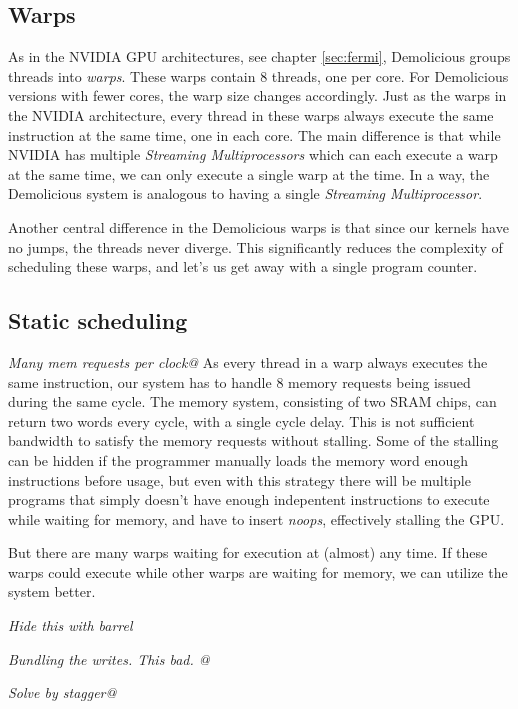 \documentclass[../main/report.tex]{subfiles}
\begin{document}
\subsection{Warps}

As in the NVIDIA GPU architectures, see chapter \ref{sec:fermi}, Demolicious groups threads into \emph{warps}.
These warps contain 8 threads, one per core. 
For Demolicious versions with fewer cores, the warp size changes accordingly.
Just as the warps in the NVIDIA architecture, every thread in these warps always execute the same instruction at the same time, one in each core.
The main difference is that while NVIDIA has multiple \emph{Streaming Multiprocessors} which can each execute a warp at the same time, we can only execute a single warp at the time.
In a way, the Demolicious system is analogous to having a single \emph{Streaming Multiprocessor}.

Another central difference in the Demolicious warps is that since our kernels have no jumps, the threads never diverge.
This significantly reduces the complexity of scheduling these warps, and let's us get away with a single program counter.

\subsection{Static scheduling}

\emph{Many mem requests per clock@}
As every thread in a warp always executes the same instruction, our system has to handle 8 memory requests being issued during the same cycle.
The memory system, consisting of two SRAM chips, can return two words every cycle, with a single cycle delay.
This is not sufficient bandwidth to satisfy the memory requests without stalling.
Some of the stalling can be hidden if the programmer manually loads the memory word enough instructions before usage, but even with this strategy there will be multiple programs that simply doesn't have enough indepentent instructions to execute while waiting for memory, and have to insert \emph{noops}, effectively stalling the GPU.

But there are many warps waiting for execution at (almost) any time. 
If these warps could execute while other warps are waiting for memory, we can utilize the system better.

\emph{Hide this with barrel}

\emph{Bundling the writes. This bad. @}

\emph{Solve by stagger@}
\end{document}
